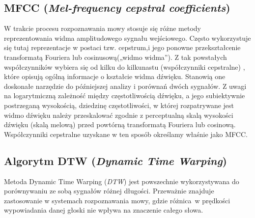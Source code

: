 \documentclass{classrep}
\begin{document}
\subsection{MFCC (\textit{Mel-frequency cepstral coefficients})}
W trakcie procesu rozpoznawania mowy stosuje się różne metody reprezentowania widma amplitudowego sygnału wejściowego. Często wykorzystuje się tutaj reprezentacje w postaci tzw. cepstrum,i jego ponowne przekształcenie transformatą Fouriera lub cosinusową(„widmo widma”). Z tak powstałych współczynników wybiera się od kilku do kilkunastu (współczynniki cepstralne) , które opisują ogólną informacje o kształcie widma dźwięku. Stanowią one doskonałe narzędzie do późniejszej analizy i porównań dwóch sygnałów. Z uwagi na logarytmiczną zależność między częstotliwością dźwięku, a jego subiektywnie postrzeganą wysokością, dziedzinę częstotliwości, w której rozpatrywane jest widmo dźwięku należy przeskalować zgodnie z perceptualną skalą wysokości dźwięku (skalą melową)
przed powtórną transformatą Fouriera lub cosinową. Współczynniki cepstralne uzyskane w ten
sposób określamy właśnie jako MFCC.

\subsection{Algorytm DTW (\textit{Dynamic Time Warping})}
Metoda Dynamic Time Warping (\textit{DTW}) jest powszechnie wykorzystywana do porównywaniu ze sobą sygnałów różnej długości. Przeważnie znajduje zastosowanie w systemach rozpoznawania mowy, gdzie różnica~w prędkości wypowiadania danej głoski nie wpływa na znaczenie całego słowa.
\end{document}
